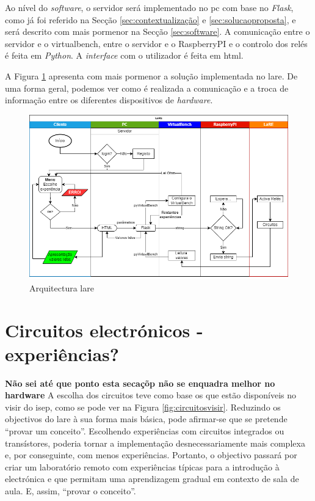 Ao nível do \textit{software}, o servidor será implementado no \acrshort{pc} com base no \textit{Flask}, como já foi referido na Secção \ref{sec:contextualização} e \ref{sec:solucaoproposta}, e será descrito com mais pormenor na Secção \ref{sec:software}. A comunicação entre o servidor e o \acrshort{virtualbench}, entre o servidor e o \gls{RaspberryPI} e o controlo dos relés é feita em \textit{Python}. A \textit{interface} com o utilizador é feita em \acrshort{html}.

A Figura {\ref{fig:arquitecturalore}} apresenta com mais pormenor a solução implementada no \acrshort{lare}. De uma forma geral, podemos ver como é realizada a comunicação e a troca de informação entre os diferentes dispositivos de \textit{hardware}.

\begin{figure}[hbtp]
	\centering
	\includegraphics[width=1\textwidth]{figures/Diagrama_SOFTWARE.drawio.png}
	\caption{Arquitectura \acrshort{lare}}
	\label{fig:arquitecturalore}
\end{figure}

\section{Circuitos electrónicos - experiências?}
\label{sec:circuitos}
\textbf{Não sei até que ponto esta secaçõp não se enquadra melhor no hardware}
A escolha dos circuitos teve como base os que estão disponíveis no \acrshort{visir} do \acrshort{isep}, como se pode ver na Figura \ref{fig:circuitosvisir}. Reduzindo os objectivos do \acrshort{lare} à sua forma mais básica, pode afirmar-se que se pretende ``provar um conceito''. Escolhendo experiências com circuitos integrados ou transístores, poderia tornar a implementação desnecessariamente mais complexa e, por conseguinte, com menos experiências. Portanto, o objectivo passará por criar um \acrshort{laboratório remoto} com experiências típicas para a introdução à electrónica e que permitam uma aprendizagem gradual em contexto de sala de aula. E, assim, ``provar o conceito''.

